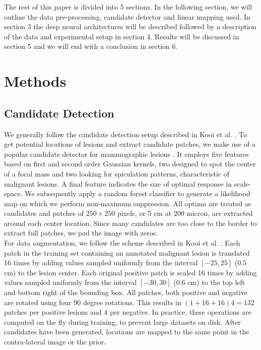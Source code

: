 \documentclass[12pt]{spieman}  %
\begin{document}
The rest of this paper is divided into 5 sections. In the following section, we will outline the data pre-processing, candidate detector and linear mapping used. In section 3 the deep neural architectures will be described followed by a description of the data and experimental setup in section 4. Results will be discussed in section 5 and we will end with a conclusion in section 6.

\section{Methods}
\subsection{Candidate Detection}
\label{sec::candidate_detection}
We generally follow the candidate detection setup described in Kooi et al. \cite{Kooi16}. To get potential locations of lesions and extract candidate patches, we make use of a popular candidate detector for mammographic lesions \cite{Kars96a}. It employs five features based on first and second order Gaussian kernels, two designed to spot the center of a focal mass and two looking for spiculation patterns, characteristic of malignant lesions. A final feature indicates the size of optimal response in scale-space. We subsequently apply a random forest \cite{Brei01} classifier to generate a likelihood map on which we perform non-maximum suppression. All optima are treated as candidates and patches of $250 \times 250$ pixels, or 5 cm at 200 micron, are extracted around each center location. Since many candidates are too close to the border to extract full patches, we pad the image with zeros. \\

For data augmentation, we follow the scheme described in Kooi et al. \cite{Kooi16}. Each patch in the training set containing an annotated malignant lesion is translated 16 times by adding values sampled uniformly from the interval $[-25, 25]$ ($0.5$ cm) to the lesion center. Each original positive patch is scaled 16 times by adding values sampled uniformly from the interval $[-30, 30]$ ($0.6$ cm) to the top left and bottom right of the bounding box. All patches, both positive and negative are rotated using four 90 degree rotations. This results in $(1+16+16)4 = 132$ patches per positive lesions and $4$ per negative. In practice, these operations are computed on the fly during training, to prevent large datasets on disk. After candidates have been generated, locations are mapped to the same point in the contra-lateral image or the prior. 
\end{document}
